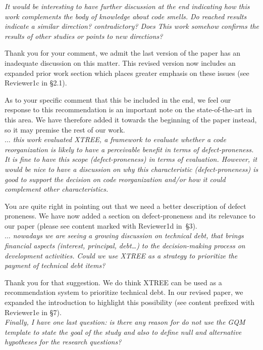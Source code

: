 \documentclass[twocolumn,5p]{elsarticle}
\newcommand{\tion}[1]{\S#1}
\newcommand{\review}[1]{\noindent\textit{#1\\}}
\theoremstyle{break}
\begin{document}
\review{It would be interesting to have further discussion at the 
	end 
	indicating how this work complements the body of knowledge about code 
	smells. Do 
	reached results indicate a similar direction? contradictory? Does This work 
	somehow confirms the results of other studies or points to new 
	directions?}

Thank you for your comment, we admit the last version of the paper has 
an inadequate discussion on this matter. This revised version now includes an 
expanded prior work section which places greater emphasis on these issues 
(see {\color{steel} Reviewer1c} in 
\tion{2.1}). 

As to your specific comment that this be included in the 
end, we feel our response to this recommendation is an important note on 
the state-of-the-art in this area. We have therefore added it towards the 
beginning of the paper instead, so it may premise the rest of our work.\\

\review{$\ldots$ this work evaluated XTREE, a framework to 
	evaluate whether a code reorganization is likely to have a perceivable 
	benefit in terms of defect-proneness. It is fine to have this scope 
	(defect-proneness) in terms of evaluation. However, it would be nice to 
	have a discussion on why this characteristic (defect-proneness) is good to 
	support the decision on code reorganization and/or how it could complement 
	other characteristics.}

You are quite right in pointing out that we need a better description of 
defect proneness. We have now added a section on defect-proneness and its 
relevance to our paper (please see content marked with {\color{steel} 
	Reviewer1d} in~\tion{3}).\\

\review{$\ldots$ nowadays we are seeing a growing discussion on 
	technical debt, 
	that brings financial aspects (interest, principal, debt…) to the 
	decision-making process on development activities. Could we use XTREE as a 
	strategy to prioritize the payment of technical debt items?}

Thank you for that suggestion. We do think XTREE can be used as a 
recommendation system to prioritize technical debt. In our revised paper, 
we expanded the introduction to highlight this possibility (see 
content prefixed with {\color{steel}Reviewer1e} in \tion{7}).\\

\review{Finally, I have one last question: is there any reason for 
	do not 
	use the GQM template to state the goal of the study and also to define null 
	and alternative hypotheses for the research questions?}
\end{document}

